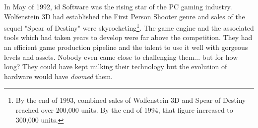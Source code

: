 In May of 1992, id Software was the rising star of the PC gaming industry. Wolfenstein 3D had established the First Person Shooter genre and sales of the sequel "Spear of Destiny" were skyrocketing\footnote{By the end of 1993, combined sales of Wolfenstein 3D and Spear of Destiny reached over 200,000 units. By the end of 1994, that figure increased to 300,000 units.}. The game engine and the associated tools which had taken years to develop were far above the competition. They had an efficient game production pipeline and the talent to use it well with gorgeous levels and assets. Nobody even came close to challenging them... but for how long? They could have kept milking their technology but the evolution of hardware would have \textit{doomed} them.\\
\par


